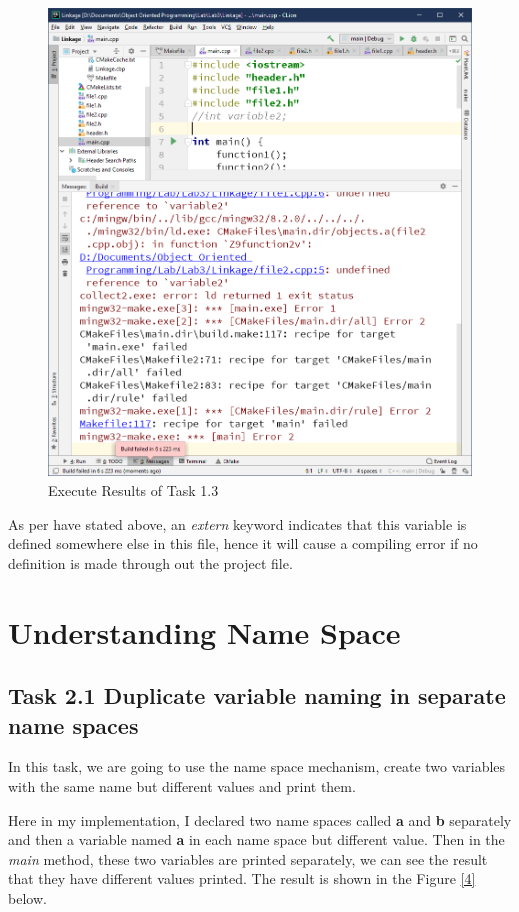 \documentclass[a4paper]{report}
\begin{document}
\begin{figure}
  \centering
  \includegraphics[scale=0.5]{Onethree.PNG}
  \caption{Execute Results of Task 1.3}\label{3}
\end{figure}


As per have stated above, an \emph{extern} keyword indicates that this variable is defined somewhere else in this file, hence it will cause a compiling error if no definition is made through out the project file.


\chapter{Understanding Name Space}
\section{Task 2.1 Duplicate variable naming in separate name spaces}
In this task, we are going to use the name space mechanism, create two variables with the same name but different values and print them.
\par
Here in my implementation, I declared two name spaces called \textbf{a} and \textbf{b} separately and then a variable named \textbf{a} in each name space but different value. Then in the \emph{main} method, these two variables are printed separately, we can see the result that they have different values printed. The result is shown in the Figure \ref{4} below.
\end{document}
